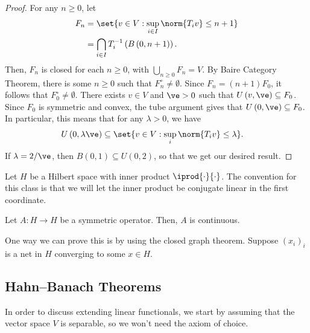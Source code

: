 \documentclass[10pt]{mypackage}
\begin{document}
\begin{proof}
  For any $n\geq 0$, let 
  \begin{align*}
    F_n &= \set{v\in V : \sup_{i\in I}\norm{T_iv} \leq n+1}\\
        &= \bigcap_{i\in I} T_i^{-1}\left( B\left( 0,n+1 \right) \right).
  \end{align*}
  Then, $F_n$ is closed for each $n\geq 0$, with $\bigcup_{n\geq 0} F_n = V$. By Baire Category Theorem, there is some $n\geq 0$ such that $F_n^{\circ}\neq \emptyset$. Since $F_n = \left( n+1 \right)F_0$, it follows that $F_0^{\circ} \neq \emptyset$. There exists $v\in V$ and $\ve > 0$ such that $U\left( v,\ve \right)\subseteq F_0$. Since $F_0$ is symmetric and convex, the tube argument gives that $U\left( 0,\ve \right)\subseteq F_0$. In particular, this means that for any $\lambda > 0$, we have
  \begin{align*}
    U\left( 0,\lambda\ve \right) &\subseteq \set{v\in V : \sup_{i}\norm{T_iv}\leq \lambda}.
  \end{align*}
  If $\lambda = 2/\ve$, then $B\left( 0,1 \right)\subseteq U\left( 0,2 \right)$, so that we get our desired result.
\end{proof}
\begin{example}
  Let $H$ be a Hilbert space with inner product $ \iprod{\cdot}{\cdot} $. The convention for this class is that we will let the inner product be conjugate linear in the first coordinate.

  Let $A\colon H\to H$ be a symmetric operator. Then, $A$ is continuous.

  One way we can prove this is by using the closed graph theorem. Suppose $\left( x_i \right)_i$ is a net in $H$ converging to some $x\in H$. 
\end{example}
\subsection{Hahn--Banach Theorems}%
In order to discuss extending linear functionals, we start by assuming that the vector space $V$ is separable, so we won't need the axiom of choice.
\end{document}
